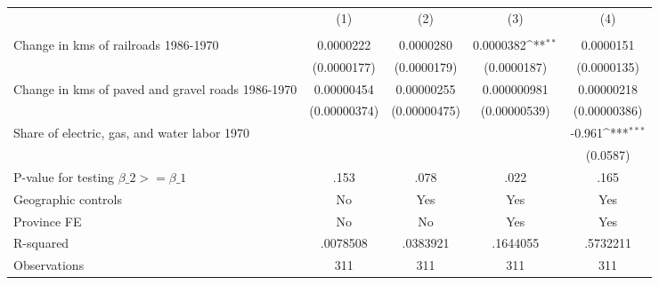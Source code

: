{
\def\sym#1{\ifmmode^{#1}\else\(^{#1}\)\fi}
\begin{tabular}{l*{4}{c}}
\hline\hline
                &\multicolumn{1}{c}{(1)}&\multicolumn{1}{c}{(2)}&\multicolumn{1}{c}{(3)}&\multicolumn{1}{c}{(4)}\\
                &\multicolumn{1}{c}{}&\multicolumn{1}{c}{}&\multicolumn{1}{c}{}&\multicolumn{1}{c}{}\\
\hline
Change in kms of railroads 1986-1970&0.0000222         &0.0000280         &0.0000382\sym{**} &0.0000151         \\
                &(0.0000177)         &(0.0000179)         &(0.0000187)         &(0.0000135)         \\
[1em]
Change in kms of paved and gravel roads 1986-1970&0.00000454         &0.00000255         &0.000000981         &0.00000218         \\
                &(0.00000374)         &(0.00000475)         &(0.00000539)         &(0.00000386)         \\
[1em]
Share of electric, gas, and water labor 1970&                  &                  &                  &   -0.961\sym{***}\\
                &                  &                  &                  & (0.0587)         \\
\hline
P-value for testing $\beta\_{2} >= \beta\_{1}$&     .153         &     .078         &     .022         &     .165         \\
Geographic controls&       No         &      Yes         &      Yes         &      Yes         \\
Province FE     &       No         &       No         &      Yes         &      Yes         \\
R-squared       & .0078508         & .0383921         & .1644055         & .5732211         \\
Observations    &      311         &      311         &      311         &      311         \\
\hline\hline
\end{tabular}
}

